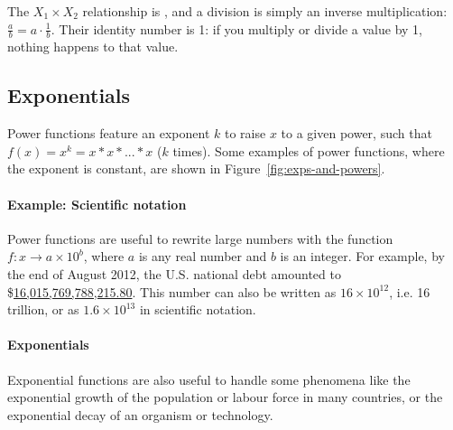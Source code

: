   The $X_1 \times X_2$ relationship is , and a division is simply an inverse multiplication: $\frac{a}{b} = a \cdot \frac{1}{b}$. Their identity number is 1: if you multiply or divide a value by 1, nothing happens to that value.%


%
%
\subsection{Exponentials}

Power functions feature an exponent $k$ to raise $x$ to a given power, such that $f(x) = x^k = x*x*...*x$ ($k$ times). Some examples of power functions, where the exponent is constant, are shown in Figure~\ref{fig:exps-and-powers}.%

%
\paragraph{Example: Scientific notation}%
%
Power functions are useful to rewrite large numbers with the function $f: x \to a \times 10^b$, where $a$ is any real number and $b$ is an integer. For example, by the end of August 2012, the U.S. national debt amounted to \$\href{http://www.treasurydirect.gov/NP/BPDLogin?application=np}{16,015,769,788,215.80}. This number can also be written as $16 \times 10^{12}$, i.e. 16 trillion, or as \ensuremath{1.6\times 10^{13}} in scientific notation.

%
\paragraph{Exponentials}

Exponential functions are also useful to handle some phenomena like the exponential growth of the population or labour force in many countries, or the exponential decay of an organism or technology.

